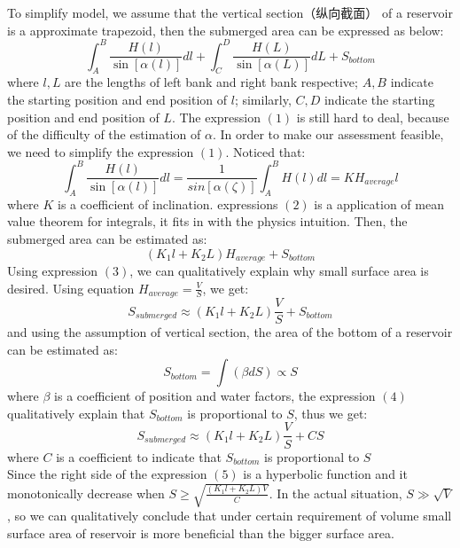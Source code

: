 \documentclass[nocover]{cumcmart}
\begin{document}
To simplify model, we assume that the vertical section（纵向截面） of a reservoir is a approximate trapezoid, then the submerged area can be expressed as below:
\begin{equation}\int_{A}^{B}\frac{H\left(l\right)}{\sin\left[\alpha\left(l\right)\right]}dl + \int_{C}^{D}\frac{H\left(L\right)}{\sin\left[\alpha\left(L\right)\right]}dL + S_{bottom}\end{equation}
where $l, L$ are the lengths of left bank and right bank respective; $A, B$ indicate the starting position and end position of $l$; similarly, $C, D$ indicate the starting position and end position of $L$.
The expression $\left(1\right)$ is still hard to deal, because of the difficulty of the estimation of $\alpha$. In order to make our assessment feasible, we need to simplify the expression $\left(1\right)$. Noticed that:
\begin{equation}
\int_{A}^{B}\frac{H\left(l\right)}{\sin\left[\alpha\left(l\right)\right]}dl = \frac{1}{sin\left[\alpha\left(\zeta\right)\right]}\int_{A}^{B}H\left(l\right)dl
= KH_{average}l
\end{equation}
where $K$ is a coefficient of inclination. expressions $\left(2\right)$ is a application of mean value theorem for integrals, it fits in with the physics intuition. Then, the submerged area can be estimated as:
\begin{equation}
\left(K_{1}l + K_{2}L\right)H_{average} + S_{bottom}
\end{equation}
Using expression $\left(3\right)$, we can qualitatively explain why small surface area is desired. Using equation $H_{average} = \frac{V}{S}$, we get:
\[S_{submerged} \approx \left(K_{1}l + K_{2}L\right)\frac{V}{S} + S_{bottom}\]
and using the assumption of vertical section, the area of the bottom of a reservoir can be estimated as:
\begin{equation}
S_{bottom} = \int\left(\beta dS \right) \propto S
\end{equation}
where $\beta$ is a coefficient of position and water factors, the expression $\left(4\right)$ qualitatively explain that $S_{bottom}$ is proportional to $S$, thus we get:
\begin{equation}
S_{submerged} \approx \left(K_{1}l + K_{2}L\right)\frac{V}{S} + CS
\end{equation}
where $C$ is a coefficient to indicate that $S_{bottom}$ is proportional to $S$\\
Since the right side of the expression $\left(5\right)$ is a hyperbolic function and it monotonically decrease when $S \geq \sqrt{\frac{\left(K_{1}l + K_{2}L\right)V}{C}}$. In the actual situation, $S \gg \sqrt{V}$, so we can qualitatively conclude that under certain requirement of volume small surface area of reservoir is more beneficial than the bigger surface area.
\end{document}
